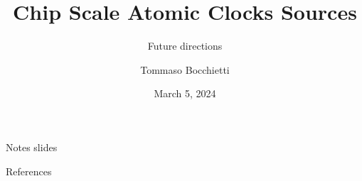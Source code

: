 \documentclass[10pt]{beamer}
\title{Chip Scale Atomic Clocks Sources}
\subtitle{Future directions}
\date{March 5, 2024}
\author{Tommaso Bocchietti}
\institute{University of Waterloo}
\begin{document}
\maketitle


\appendix

\begin{frame}[standout]
    Notes slides
\end{frame}



\begin{frame}[allowframebreaks]{References}
    
    
\end{frame}
\end{document}
